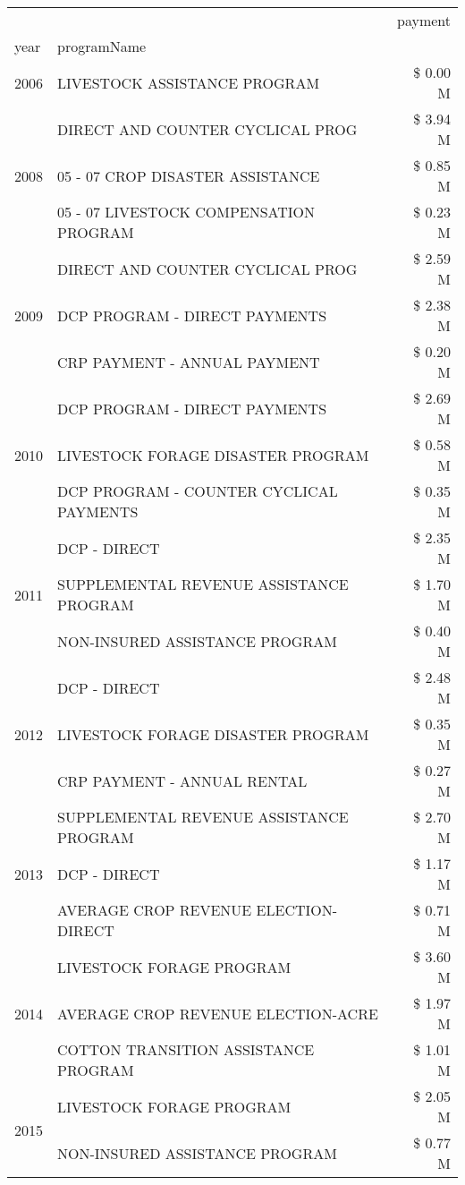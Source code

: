 \begin{tabular}{llr}
\toprule
 &  & payment \\
year & programName &  \\
\midrule
2006 & LIVESTOCK ASSISTANCE PROGRAM & \$ 0.00 M \\
\cline{1-3}
\multirow[t]{3}{*}{2008} & DIRECT AND COUNTER CYCLICAL PROG & \$ 3.94 M \\
 & 05 - 07 CROP DISASTER ASSISTANCE & \$ 0.85 M \\
 & 05 - 07 LIVESTOCK COMPENSATION PROGRAM & \$ 0.23 M \\
\cline{1-3}
\multirow[t]{3}{*}{2009} & DIRECT AND COUNTER CYCLICAL PROG & \$ 2.59 M \\
 & DCP PROGRAM - DIRECT PAYMENTS & \$ 2.38 M \\
 & CRP PAYMENT - ANNUAL PAYMENT & \$ 0.20 M \\
\cline{1-3}
\multirow[t]{3}{*}{2010} & DCP PROGRAM - DIRECT PAYMENTS & \$ 2.69 M \\
 & LIVESTOCK FORAGE DISASTER  PROGRAM & \$ 0.58 M \\
 & DCP PROGRAM - COUNTER CYCLICAL PAYMENTS & \$ 0.35 M \\
\cline{1-3}
\multirow[t]{3}{*}{2011} & DCP - DIRECT & \$ 2.35 M \\
 & SUPPLEMENTAL REVENUE ASSISTANCE PROGRAM & \$ 1.70 M \\
 & NON-INSURED ASSISTANCE PROGRAM & \$ 0.40 M \\
\cline{1-3}
\multirow[t]{3}{*}{2012} & DCP - DIRECT & \$ 2.48 M \\
 & LIVESTOCK FORAGE DISASTER PROGRAM & \$ 0.35 M \\
 & CRP PAYMENT - ANNUAL RENTAL & \$ 0.27 M \\
\cline{1-3}
\multirow[t]{3}{*}{2013} & SUPPLEMENTAL REVENUE ASSISTANCE PROGRAM & \$ 2.70 M \\
 & DCP - DIRECT & \$ 1.17 M \\
 & AVERAGE CROP REVENUE ELECTION-DIRECT & \$ 0.71 M \\
\cline{1-3}
\multirow[t]{3}{*}{2014} & LIVESTOCK FORAGE PROGRAM & \$ 3.60 M \\
 & AVERAGE CROP REVENUE ELECTION-ACRE & \$ 1.97 M \\
 & COTTON TRANSITION ASSISTANCE PROGRAM & \$ 1.01 M \\
\cline{1-3}
\multirow[t]{3}{*}{2015} & LIVESTOCK FORAGE PROGRAM & \$ 2.05 M \\
 & NON-INSURED ASSISTANCE PROGRAM & \$ 0.77 M \\

\end{tabular}
